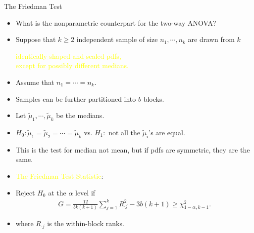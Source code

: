 \begin{frame}{The Friedman Test}
	\begin{itemize}
		\item[] What is the nonparametric counterpart for the two-way ANOVA?
		\bigskip
		\item[Setup] Suppose that $k\ge 2$ independent sample of size $n_1,\cdots,n_k$ are drawn from $k$
		\begin{center}
			\textcolor{yellow}{identically shaped and scaled pdfs,}\\
			\textcolor{yellow}{except for possibly different medians.}
		\end{center}
		\item[] Assume that $ n_1=\cdots=n_k$.
		\item[] Samples can be further partitioned into $b$ blocks.
		\item[] Let $\widetilde{\mu}_1,\cdots,\widetilde{\mu}_k$ be the medians.
		\bigskip
		\item[Test] $H_0:\widetilde{\mu}_1=\widetilde{\mu}_2=\cdots=\widetilde{\mu}_k$ vs. $ H_1:$ not all the $\widetilde{\mu}_i$'s are equal.
		\bigskip
		\item[Remark] This is the test for median not mean, but if pdfs are symmetric, they are the same.
	\end{itemize}
\end{frame}
\begin{frame}[fragile]
	\begin{itemize}
		\item[] \textcolor{yellow}{The Friedman Test Statistic}:
		\item[] Reject $H_0$ at the $\alpha$ level if
			\begin{align*}
				G = \frac{12}{bk(k+1)}\sum_{j=1}^k R_{\cdot j}^2  - 3b(k+1) \ge \chi_{1-\alpha,k-1}^2.
			\end{align*}
		\item[] where $R_{\cdot j}$ is the within-block ranks.
	\end{itemize}
\end{frame}
